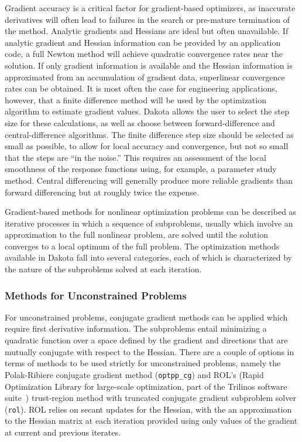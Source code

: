 Gradient accuracy is a critical factor for gradient-based optimizers,
as inaccurate derivatives will often lead to failures in the search or
pre-mature termination of the method.  Analytic gradients and Hessians
are ideal but often unavailable.  If analytic gradient and Hessian
information can be provided by an application code, a full Newton
method will achieve quadratic convergence rates near the solution. If
only gradient information is available and the Hessian information is
approximated from an accumulation of gradient data, superlinear
convergence rates can be obtained.  It is most often the case for
engineering applications, however, that a finite difference method
will be used by the optimization algorithm to estimate gradient
values. Dakota allows the user to select the step size for these
calculations, as well as choose between forward-difference and
central-difference algorithms. The finite difference step size should
be selected as small as possible, to allow for local accuracy and
convergence, but not so small that the steps are ``in the noise.''
This requires an assessment of the local smoothness of the response
functions using, for example, a parameter study method. Central
differencing will generally produce more reliable gradients than
forward differencing but at roughly twice the expense.

Gradient-based methods for nonlinear optimization problems can be
described as iterative processes in which a sequence of subproblems,
usually which involve an approximation to the full nonlinear problem,
are solved until the solution converges to a local optimum of the full
problem.  The optimization methods available in Dakota fall into
several categories, each of which is characterized by the nature of
the subproblems solved at each iteration.

\subsubsection{Methods for Unconstrained Problems}
\label{opt:methods:gradient:unconstrained}

For unconstrained problems, conjugate gradient methods can be applied 
which require first derivative information. The subproblems entail 
minimizing a quadratic function over a space defined by the gradient 
and directions that are mutually conjugate with respect to the 
Hessian. There are a couple of options in terms of methods to be used 
strictly for unconstrained problems, namely the Polak-Ribiere 
conjugate gradient method (\texttt{optpp\_cg}) and ROL's (Rapid 
Optimization Library for large-scale optimization, part of the 
Trilinos software suite~\cite{Kou2014}) trust-region method with 
truncated conjugate gradient subproblem solver (\texttt{rol}). ROL 
relies on secant updates for the Hessian, with the an approximation to 
the Hessian matrix at each iteration provided using only values of the 
gradient at current and previous iterates.

